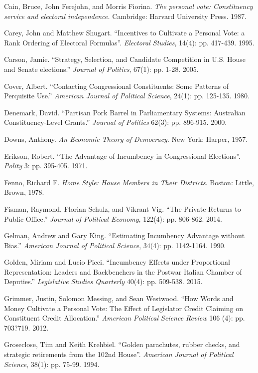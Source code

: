 \documentclass[letter,12pt]{article}
\begin{document}
\begin{hangparas}{.25in}{1}
Cain, Bruce, John Ferejohn, and Morris Fiorina. \textit{The personal vote: Constituency service and electoral independence.} Cambridge: Harvard University Press. 1987.

Carey, John and Matthew Shugart. ``Incentives to Cultivate a Personal Vote: a Rank Ordering of Electoral Formulas''. \textit{Electoral Studies}, 14(4): pp. 417-439. 1995.

Carson, Jamie. ``Strategy, Selection, and Candidate Competition in U.S. House and Senate elections.'' \textit{Journal of Politics}, 67(1): pp. 1-28. 2005.

Cover, Albert. ``Contacting Congressional Constituents: Some Patterns of Perquisite Use.'' \textit{American Journal of Political Science}, 24(1): pp. 125-135. 1980.

Denemark, David. ``Partisan Pork Barrel in Parliamentary Systems: Australian Constituency-Level Grants.'' \textit{Journal of Politics} 62(3): pp. 896-915. 2000.

Downs, Anthony. \textit{An Economic Theory of Democracy}. New York: Harper, 1957.

Erikson, Robert. ``The Advantage of Incumbency in Congressional Elections''. \textit{Polity} 3: pp. 395-405. 1971.

Fenno, Richard F. \textit{Home Style: House Members in Their Districts}. Boston: Little, Brown, 1978.

Fisman, Raymond, Florian Schulz, and Vikrant Vig. ``The Private Returns to Public Office.'' \textit{Journal of Political Economy}, 122(4): pp. 806-862. 2014.

Gelman, Andrew and Gary King. ``Estimating Incumbency Advantage without Bias.'' \textit{American Journal of Political Science}, 34(4): pp. 1142-1164. 1990.

Golden, Miriam and Lucio Picci. ``Incumbency Effects under Proportional Representation: Leaders and Backbenchers in the Postwar Italian Chamber of Deputies.'' \textit{Legislative Studies Quarterly} 40(4): pp. 509-538. 2015.

Grimmer, Justin, Solomon Messing, and Sean Westwood. ``How Words and Money Cultivate a Personal Vote: The Effect of Legislator Credit Claiming on Constituent Credit Allocation.'' \textit{American Political Science Review} 106 (4): pp. 703?719. 2012.

Groseclose, Tim and Keith Krehbiel. ``Golden parachutes, rubber checks, and strategic retirements from the 102nd House''. \textit{American Journal of Political Science}, 38(1): pp. 75-99. 1994.


\end{hangparas}
\end{document}

